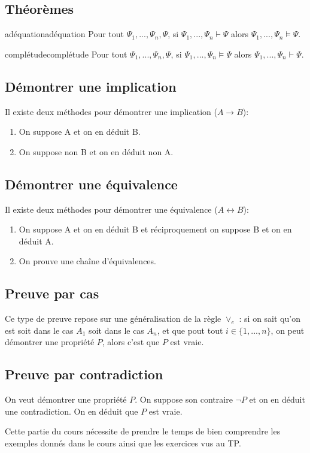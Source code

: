 \subsection{Théorèmes}
\begin{definition}{adéquation}{adéquation}
Pour tout $\Psi_1,...,\Psi_n,\Psi$, si $\Psi_1,...,\Psi_n\vdash\Psi$ alors $\Psi_1,...,\Psi_n\vDash\Psi$.
\end{definition}
\begin{definition}{complétude}{complétude}
Pour tout $\Psi_1,...,\Psi_n,\Psi$, si $\Psi_1,...,\Psi_n\vDash\Psi$ alors $\Psi_1,...,\Psi_n\vdash\Psi$.
\end{definition}

\subsection{Démontrer une implication}
Il existe deux méthodes pour démontrer une implication ($A\rightarrow B$):
\begin{enumerate}
    \item On suppose A et on en déduit B.
    \item On suppose non B et on en déduit non A.
\end{enumerate}

\subsection{Démontrer une équivalence}
Il existe deux méthodes pour démontrer une équivalence ($A\leftrightarrow B$):
\begin{enumerate}
    \item On suppose A et on en déduit B et réciproquement on suppose B et on en déduit A.
    \item On prouve une chaîne d'équivalences.
\end{enumerate}

\subsection{Preuve par cas}
Ce type de preuve repose sur une généralisation de la règle $\lor_e$ : si on sait qu'on est soit dans le cas $A_1$ soit dans le cas $A_n$, et que pout tout $i\in\{1,...,n\}$, on peut démontrer une propriété $P$, alors c'est que $P$ est vraie.

\subsection{Preuve par contradiction}
On veut démontrer une propriété $P$. On suppose son contraire $\neg P$ et on en déduit une contradiction. On en déduit que $P$ est vraie.

\begin{remark}
Cette partie du cours nécessite de prendre le temps de bien comprendre les exemples donnés dans le cours ainsi que les exercices vus au TP.
\end{remark}